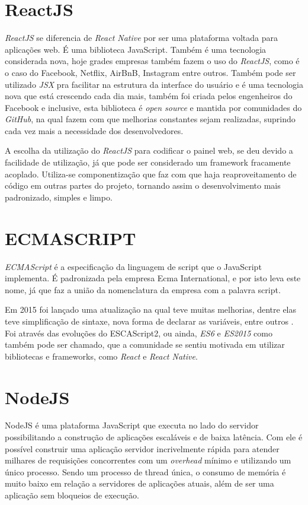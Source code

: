 \section{ReactJS}
\textit{ReactJS} se diferencia de \textit{React Native} por ser uma plataforma voltada para aplicações web. É uma biblioteca JavaScript. Também é uma tecnologia considerada nova, hoje grades empresas também fazem o uso do \textit{ReactJS}, como é o caso do Facebook, Netflix, AirBnB, Instagram entre outros. Também pode ser utilizado \textit{JSX} pra facilitar na estrutura da interface do usuário e é uma tecnologia nova que está crescendo cada dia mais, também foi criada pelos engenheiros do Facebook e inclusive, esta biblioteca é \textit{open source} e mantida por comunidades do \textit{GitHub}, na qual fazem com que melhorias constantes sejam realizadas, suprindo cada vez mais a necessidade dos desenvolvedores.

A escolha da utilização do \textit{ReactJS} para codificar o painel web, se deu devido a facilidade de utilização, já que pode ser considerado um framework fracamente acoplado. Utiliza-se componentização que faz com que haja reaproveitamento de código em outras partes do projeto, tornando assim o desenvolvimento mais padronizado, simples e limpo.



\section{ECMASCRIPT}

\textit{ECMAScript} é a especificação da linguagem de script que o JavaScript implementa. É padronizada pela empresa Ecma International, e por isto leva este nome, já que faz a união da nomenclatura da empresa com a palavra script. 

Em 2015 foi lançado uma atualização na qual teve muitas melhorias, dentre elas teve simplificação de sintaxe, nova forma de declarar as variáveis, entre outros \cite{ecma}.
Foi através das evoluções do ESCAScript2, ou ainda, \textit{ES6} e \textit{ES2015} como também pode ser chamado, que a comunidade se sentiu motivada em utilizar bibliotecas e frameworks, como \textit{React} e \textit{React Native}. 


\section{NodeJS}
NodeJS é uma plataforma JavaScript que executa no lado do servidor possibilitando a construção de aplicações escaláveis e de baixa latência. Com ele é possível construir uma aplicação servidor incrivelmente rápida para atender milhares de requisições concorrentes com um \textit{overhead} mínimo e utilizando um único processo. Sendo um processo de thread única, o consumo de memória é muito baixo em relação a servidores de aplicações atuais, além de ser uma aplicação sem bloqueios de execução. \cite{node}

